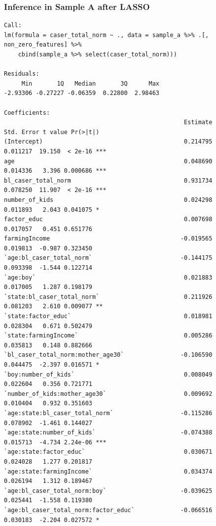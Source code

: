 \documentclass{article}
\begin{document}
\begin{figure}[H]
\subsubsection*{Inference in Sample A after LASSO}
\begin{lstlisting}[style=RstyleCommentSmall, caption=CATE with Controls selected by LASSO]
Call:
lm(formula = caser_total_norm ~ ., data = sample_a %>% .[, non_zero_features] %>% 
    cbind(sample_a %>% select(caser_total_norm)))

Residuals:
     Min       1Q   Median       3Q      Max 
-2.93306 -0.27227 -0.06359  0.22800  2.98463 

Coefficients:
                                                   Estimate Std. Error t value Pr(>|t|)    
(Intercept)                                        0.214795   0.011217  19.150  < 2e-16 ***
age                                                0.048690   0.014336   3.396 0.000686 ***
bl_caser_total_norm                                0.931734   0.078250  11.907  < 2e-16 ***
number_of_kids                                     0.024298   0.011893   2.043 0.041075 *  
factor_educ                                        0.007698   0.017057   0.451 0.651776    
farmingIncome                                     -0.019565   0.019813  -0.987 0.323450    
`age:bl_caser_total_norm`                         -0.144175   0.093398  -1.544 0.122714    
`age:boy`                                          0.021883   0.017005   1.287 0.198179    
`state:bl_caser_total_norm`                        0.211926   0.081203   2.610 0.009077 ** 
`state:factor_educ`                                0.018981   0.028304   0.671 0.502479    
`state:farmingIncome`                              0.005286   0.035813   0.148 0.882666    
`bl_caser_total_norm:mother_age30`                -0.106590   0.044475  -2.397 0.016571 *  
`boy:number_of_kids`                               0.008049   0.022604   0.356 0.721771    
`number_of_kids:mother_age30`                      0.009692   0.010404   0.932 0.351603    
`age:state:bl_caser_total_norm`                   -0.115286   0.078902  -1.461 0.144027    
`age:state:number_of_kids`                        -0.074388   0.015713  -4.734 2.24e-06 ***
`age:state:factor_educ`                            0.030671   0.024028   1.277 0.201817    
`age:state:farmingIncome`                          0.034374   0.026194   1.312 0.189467    
`age:bl_caser_total_norm:boy`                     -0.039625   0.025441  -1.558 0.119380    
`age:bl_caser_total_norm:factor_educ`             -0.066516   0.030183  -2.204 0.027572 *  

\end{lstlisting}
\end{figure}
\end{document}
